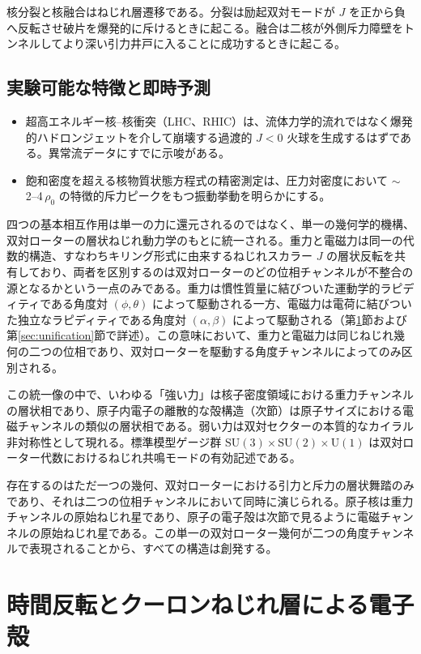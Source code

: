 \documentclass[a4paper]{article}
\begin{document}
核分裂と核融合はねじれ層遷移である。分裂は励起双対モードが $J$ を正から負へ反転させ破片を爆発的に斥けるときに起こる。融合は二核が外側斥力障壁をトンネルしてより深い引力井戸に入ることに成功するときに起こる。

\subsection{実験可能な特徴と即時予測}

\begin{itemize}
\item 超高エネルギー核--核衝突（LHC、RHIC）は、流体力学的流れではなく爆発的ハドロンジェットを介して崩壊する過渡的 $J < 0$ 火球を生成するはずである。異常流データにすでに示唆がある。
\item 飽和密度を超える核物質状態方程式の精密測定は、圧力対密度において $\sim$ 2--4\,$\rho_0$ の特徴的斥力ピークをもつ振動挙動を明らかにする。
\end{itemize}

四つの基本相互作用は単一の力に還元されるのではなく、単一の幾何学的機構、双対ローターの層状ねじれ動力学のもとに統一される。重力と電磁力は同一の代数的構造、すなわちキリング形式に由来するねじれスカラー $J$ の層状反転を共有しており、両者を区別するのは双対ローターのどの位相チャンネルが不整合の源となるかという一点のみである。重力は慣性質量に結びついた運動学的ラピディティである角度対 $(\phi, \theta)$ によって駆動される一方、電磁力は電荷に結びついた独立なラピディティである角度対 $(\alpha, \beta)$ によって駆動される（第\ref{sec:electronshells}節および第\ref{sec:unification}節で詳述）。この意味において、重力と電磁力は同じねじれ幾何の二つの位相であり、双対ローターを駆動する角度チャンネルによってのみ区別される。

この統一像の中で、いわゆる「強い力」は核子密度領域における重力チャンネルの層状相であり、原子内電子の離散的な殻構造（次節）は原子サイズにおける電磁チャンネルの類似の層状相である。弱い力は双対セクターの本質的なカイラル非対称性として現れる。標準模型ゲージ群 $\mathrm{SU}(3)\times\mathrm{SU}(2)\times\mathrm{U}(1)$ は双対ローター代数におけるねじれ共鳴モードの有効記述である。

存在するのはただ一つの幾何、双対ローターにおける引力と斥力の層状舞踏のみであり、それは二つの位相チャンネルにおいて同時に演じられる。原子核は重力チャンネルの原始ねじれ星であり、原子の電子殻は次節で見るように電磁チャンネルの原始ねじれ星である。この単一の双対ローター幾何が二つの角度チャンネルで表現されることから、すべての構造は創発する。

\section{時間反転とクーロンねじれ層による電子殻}
\label{sec:electronshells}
\end{document}
